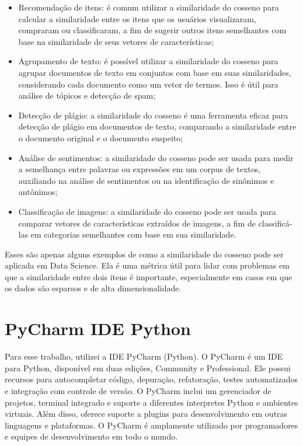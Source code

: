 \documentclass[12pt, a4paper]{article}
\begin{document}
\begin{itemize}
    \item Recomendação de itens: é comum utilizar a similaridade do cosseno para calcular a similaridade entre os itens que os usuários visualizaram, compraram ou classificaram, a fim de sugerir outros itens semelhantes com base na similaridade de seus vetores de características;
    \item Agrupamento de texto: é possível utilizar a similaridade do cosseno para agrupar documentos de texto em conjuntos com base em suas similaridades, considerando cada documento como um vetor de termos. Isso é útil para análise de tópicos e detecção de spam;
    \item Detecção de plágio: a similaridade do cosseno é uma ferramenta eficaz para detecção de plágio em documentos de texto, comparando a similaridade entre o documento original e o documento suspeito;
    \item Análise de sentimentos: a similaridade do cosseno pode ser usada para medir a semelhança entre palavras ou expressões em um corpus de textos, auxiliando na análise de sentimentos ou na identificação de sinônimos e antônimos;
    \item Classificação de imagens: a similaridade do cosseno pode ser usada para comparar vetores de características extraídos de imagens, a fim de classificá-las em categorias semelhantes com base em sua similaridade.
    
\end{itemize}
Esses são apenas alguns exemplos de como a similaridade do cosseno pode ser aplicada em Data Science. Ela é uma métrica útil para lidar com problemas em que a similaridade entre dois itens é importante, especialmente em casos em que os dados são esparsos e de alta dimensionalidade.
\section{PyCharm IDE Python}

Para esse trabalho, utilizei a IDE PyCharm (Python).
O PyCharm é um IDE para Python, disponível em duas edições, Community e Professional. Ele possui recursos para autocompletar código, depuração, refatoração, testes automatizados e integração com controle de versão. O PyCharm inclui um gerenciador de projetos, terminal integrado e suporte a diferentes interpretes Python e ambientes virtuais. Além disso, oferece suporte a plugins para desenvolvimento em outras linguagens e plataformas. O PyCharm é amplamente utilizado por programadores e equipes de desenvolvimento em todo o mundo.
\end{document}
